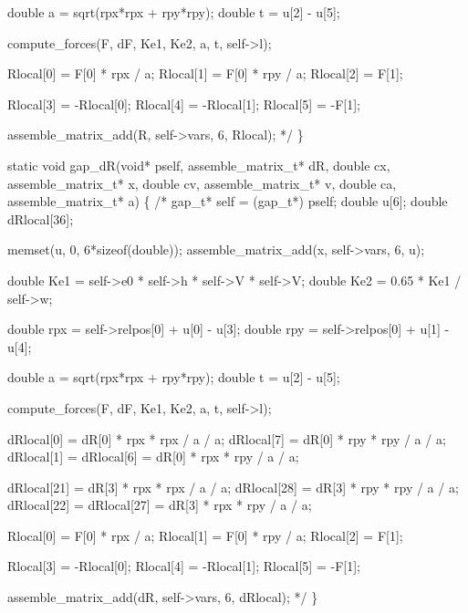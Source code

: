     double a = sqrt(rpx*rpx + rpy*rpy);
    double t = u[2] - u[5];

    compute_forces(F, dF, Ke1, Ke2, a, t, self->l);

    Rlocal[0] =  F[0] * rpx / a;
    Rlocal[1] =  F[0] * rpy / a;
    Rlocal[2] =  F[1];

    Rlocal[3] = -Rlocal[0];
    Rlocal[4] = -Rlocal[1];
    Rlocal[5] = -F[1];

    assemble_matrix_add(R, self->vars, 6, Rlocal);
*/
\}

\nwendcode{}\nwdocspar

\nwenddocs{}\plusendmoddef
static void gap_dR(void* pself, assemble_matrix_t* dR,
                   double cx, assemble_matrix_t* x,
                   double cv, assemble_matrix_t* v,
                   double ca, assemble_matrix_t* a)
\{
/*
    gap_t* self = (gap_t*) pself;
    double u[6];
    double dRlocal[36];

    memset(u, 0, 6*sizeof(double));
    assemble_matrix_add(x, self->vars, 6, u);

    double Ke1 = self->e0 * self->h * self->V * self->V;
    double Ke2 = 0.65 * Ke1 / self->w;

    double rpx = self->relpos[0] + u[0] - u[3];
    double rpy = self->relpos[0] + u[1] - u[4];

    double a = sqrt(rpx*rpx + rpy*rpy);
    double t = u[2] - u[5];

    compute_forces(F, dF, Ke1, Ke2, a, t, self->l);

    dRlocal[0]  =               dR[0] * rpx * rpx / a / a;
    dRlocal[7]  =               dR[0] * rpy * rpy / a / a;
    dRlocal[1]  = dRlocal[6]  = dR[0] * rpx * rpy / a / a;

    dRlocal[21] =               dR[3] * rpx * rpx / a / a;
    dRlocal[28] =               dR[3] * rpy * rpy / a / a;
    dRlocal[22] = dRlocal[27] = dR[3] * rpx * rpy / a / a;





    Rlocal[0] =  F[0] * rpx / a;
    Rlocal[1] =  F[0] * rpy / a;
    Rlocal[2] =  F[1];

    Rlocal[3] = -Rlocal[0];
    Rlocal[4] = -Rlocal[1];
    Rlocal[5] = -F[1];


    assemble_matrix_add(dR, self->vars, 6, dRlocal);
*/
\}

